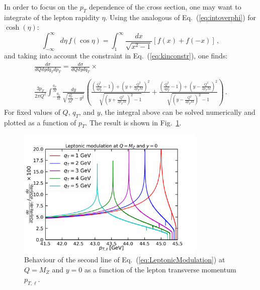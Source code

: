 \documentclass[10pt,a4paper]{article}
\begin{document}
In order to focus on the $p_T$ dependence of the cross section, one
may want to integrate of the lepton rapidity $\eta$. Using the
analogous of Eq.~(\ref{eq:intoverphi}) for $\cosh(\eta)$:
\begin{equation}\label{eq:intovereta}
\int_{-\infty}^{\infty}d\eta\, f(\cos\eta) = \int_{1}^{\infty}\frac{dx}{\sqrt{x^2-1}}\left[f(x)+f(-x)\right]\,,
\end{equation}
and taking into account the constraint in Eq.~(\ref{eq:kinconstr}),
one finds:
\begin{equation}\label{eq:LeptonicModulation}
\begin{array}{l}
\displaystyle \frac{d\sigma}{dQ dy dq_T dp_T} =\frac{d\sigma}{dQ dy
  dq_T} \times\\
\\
\displaystyle\frac
                                                          {3p_T}{2\pi
                                                          Q^2}\int_{-\frac{q_T}{M}}^{\frac{q_T}{M}}
  \frac{dy}{\sqrt{\frac{q_T^2}{M^2}-y^2}}\left(\frac{\left(\frac{Q^2}{4
  p_T^2}-1\right)+\left(y+\frac{Q^2}{2p_TM}\right)^2}{\sqrt{\left(y+\frac{Q^2}{2p_TM}\right)^2-1}}+\frac{\left(\frac{Q^2}{4
  p_T^2}-1\right)+\left(y-\frac{Q^2}{2p_TM}\right)^2}{\sqrt{\left(y-\frac{Q^2}{2p_TM}\right)^2-1}}\right)\,.
\end{array}
\end{equation}
For fixed values of $Q$, $q_T$, and $y$, the integral above can be
solved numerically and plotted as a function of $p_T$. The result is
shown in Fig.~\ref{fig:LeptonicModulation}.
\begin{figure}[t]
  \begin{centering}
    \includegraphics[width=0.8\textwidth]{plots/LeptonicModulation.pdf}
    \caption{Behaviour of the second line of
      Eq.~(\ref{eq:LeptonicModulation}) at $Q=M_Z$ and $y=0$ as a
      function of the lepton transverse momentum
      $p_{T,\ell}$.\label{fig:LeptonicModulation}}
  \end{centering}
\end{figure}
\end{document}
